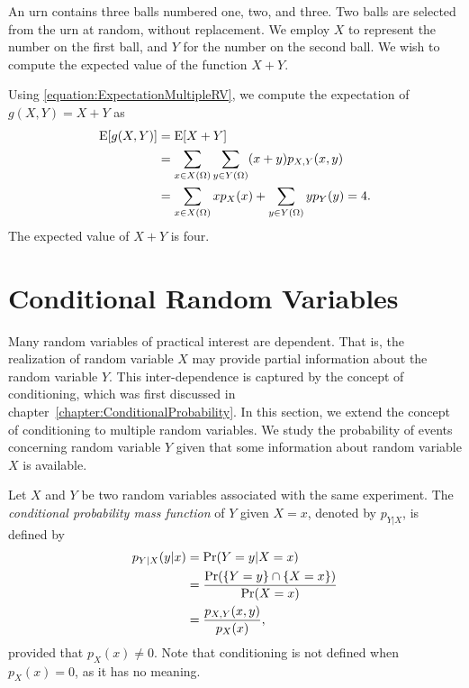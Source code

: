 \begin{example}
An urn contains three balls numbered one, two, and three.
Two balls are selected from the urn at random, without replacement.
We employ $X$ to represent the number on the first ball, and $Y$ for the number on the second ball.
We wish to compute the expected value of the function $X + Y$.

Using \eqref{equation:ExpectationMultipleRV}, we compute the expectation of $g(X,Y) = X + Y$ as
\begin{equation*}
\begin{split}
\mathrm{E} [g(X,Y)] &= \mathrm{E} [X + Y] \\
&= \sum_{x \in X(\Omega)} \sum_{y \in Y(\Omega)} (x + y) p_{X,Y} (x,y) \\
&= \sum_{x \in X(\Omega)} x p_X (x) + \sum_{y \in Y(\Omega)} y p_Y (y)
= 4.
\end{split}
\end{equation*}
The expected value of $X + Y$ is four.
\end{example}


\section{Conditional Random Variables}

Many random variables of practical interest are dependent.
That is, the realization of random variable $X$ may provide partial information about the random variable $Y$.
This inter-dependence is captured by the concept of conditioning, which was first discussed in chapter~\ref{chapter:ConditionalProbability}.
In this section, we extend the concept of conditioning to multiple random variables.
We study the probability of events concerning random variable $Y$ given that some information about random variable $X$ is available.

Let $X$ and $Y$ be two random variables associated with the same experiment.
The \emph{conditional probability mass function} of $Y$ given $X = x$, denoted by $p_{Y|X}$, is defined by
\begin{equation*}
\begin{split}
p_{Y|X} (y|x) &= \Pr ( Y = y | X = x) \\
&= \frac{\Pr (\{Y = y\} \cap \{ X = x \})}{\Pr (X = x)} \\
&= \frac{ p_{X,Y} (x,y) }{p_X(x)},
\end{split}
\end{equation*}
provided that $p_X (x) \neq 0$.
Note that conditioning is not defined when $p_X (x) = 0$, as it has no meaning.

